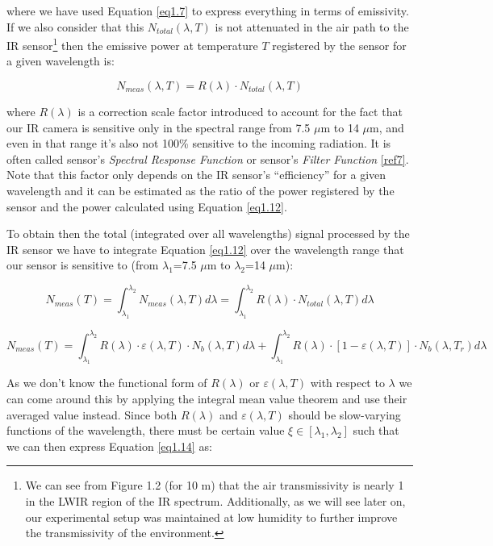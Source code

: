 		where we have used Equation \ref{eq1.7} to express everything in terms of emissivity. If we also consider that this $N_{total}(\lambda,T)$ is not attenuated in the air path to the IR sensor\footnote{{\footnotesize We can see from Figure 1.2 (for 10 m) that the air transmissivity is nearly 1 in the LWIR region of the IR spectrum. Additionally, as we will see later on, our experimental setup was maintained at low humidity to further improve the transmissivity of the environment.}} then the emissive power at temperature $T$ registered by the sensor for a given wavelength is:
		
		\begin{equation}\label{eq1.12}
			N_{meas}(\lambda,T)=R(\lambda) \cdot N_{total}(\lambda,T)
		\end{equation}\bigskip
		
		where $R(\lambda)$ is a correction scale factor introduced to account for the fact that our IR camera is sensitive only in the spectral range from 7.5 $\mu$m to 14 $\mu$m, and even in that range it’s also not 100\% sensitive to the incoming radiation. It is often called sensor’s \textit{Spectral Response Function} or sensor’s \textit{Filter Function} \ref{ref7}. Note that this factor only depends on the IR sensor’s “efficiency” for a given wavelength and it can be estimated as the ratio of the power registered by the sensor and the power calculated using Equation \ref{eq1.12}.
		
		To obtain then the total (integrated over all wavelengths) signal processed by the IR sensor we have to integrate Equation \ref{eq1.12} over the wavelength range that our sensor is sensitive to (from $\lambda_{1}$=7.5 $\mu$m to $\lambda_{2}$=14 $\mu$m):
		
		\begin{equation}\label{eq1.13}
			N_{meas}(T)= \int_{\lambda_{1}}^{\lambda_{2}} N_{meas}(\lambda,T) d\lambda = \int_{\lambda_{1}}^{\lambda_{2}} R(\lambda) \cdot N_{total}(\lambda,T) d\lambda
		\end{equation}		
		
		\begin{equation}\label{eq1.14}
			N_{meas}(T)= \int_{\lambda_{1}}^{\lambda_{2}} R(\lambda) \cdot \varepsilon(\lambda,T) \cdot N_{b}(\lambda,T) d\lambda + \int_{\lambda_{1}}^{\lambda_{2}} R(\lambda) \cdot [1- \varepsilon(\lambda,T)] \cdot N_{b}(\lambda,T_{r}) d\lambda
		\end{equation}\bigskip	
		
		As we don’t know the functional form of $R(\lambda)$ or $\varepsilon(\lambda,T)$ with respect to $\lambda$ we can come around this by applying the integral mean value theorem and use their averaged value instead. Since both $R(\lambda)$ and $\varepsilon(\lambda,T)$ should be slow-varying functions of the wavelength, there must be certain value $\xi \in [\lambda_{1},\lambda_{2}]$ such that we can then express Equation \ref{eq1.14} as:
		
